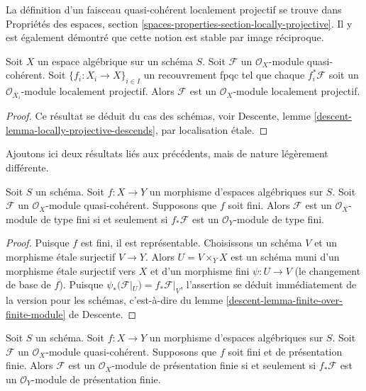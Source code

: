 \noindent
La définition d'un faisceau quasi-cohérent localement projectif se trouve dans
Propriétés des espaces, section
\ref{spaces-properties-section-locally-projective}.
Il y est également démontré que cette notion est stable par image réciproque.

\begin{lemma}
\label{lemma-locally-projective-descends}
Soit $X$ un espace algébrique sur un schéma $S$.
Soit $\mathcal{F}$ un $\mathcal{O}_X$-module quasi-cohérent.
Soit $\{f_i : X_i \to X\}_{i \in I}$ un recouvrement fpqc tel que
chaque $f_i^*\mathcal{F}$ soit un $\mathcal{O}_{X_i}$-module localement projectif.
Alors $\mathcal{F}$ est un $\mathcal{O}_X$-module localement projectif.
\end{lemma}

\begin{proof}
Ce résultat se déduit du cas des schémas, voir
Descente, lemme \ref{descent-lemma-locally-projective-descends},
par localisation \'etale.
\end{proof}

\noindent
Ajoutons ici deux résultats liés aux précédents, mais
de nature légèrement différente.

\begin{lemma}
\label{lemma-finite-over-finite-module}
Soit $S$ un schéma.
Soit $f : X \to Y$ un morphisme d'espaces algébriques sur $S$.
Soit $\mathcal{F}$ un $\mathcal{O}_X$-module quasi-cohérent.
Supposons que $f$ soit fini.
Alors $\mathcal{F}$ est un $\mathcal{O}_X$-module de type fini
si et seulement si $f_*\mathcal{F}$ est un $\mathcal{O}_Y$-module de type
fini.
\end{lemma}

\begin{proof}
Puisque $f$ est fini, il est représentable. Choisissons un schéma $V$ et un
morphisme \'etale surjectif $V \to Y$. Alors $U = V \times_Y X$ est un schéma muni d'un
morphisme \'etale surjectif vers $X$ et d'un morphisme fini
$\psi : U \to V$ (le changement de base de $f$). Puisque
$\psi_*(\mathcal{F}|_U) = f_*\mathcal{F}|_V$,
l'assertion se déduit immédiatement de la version pour les schémas,
c'est-à-dire du
lemme \ref{descent-lemma-finite-over-finite-module} de Descente.
\end{proof}

\begin{lemma}
\label{lemma-finite-finitely-presented-module}
Soit $S$ un schéma.
Soit $f : X \to Y$ un morphisme d'espaces algébriques sur $S$.
Soit $\mathcal{F}$ un $\mathcal{O}_X$-module quasi-cohérent.
Supposons que $f$ soit fini et de présentation finie.
Alors $\mathcal{F}$ est un $\mathcal{O}_X$-module de présentation finie
si et seulement si $f_*\mathcal{F}$ est un $\mathcal{O}_Y$-module de présentation
finie.
\end{lemma}

